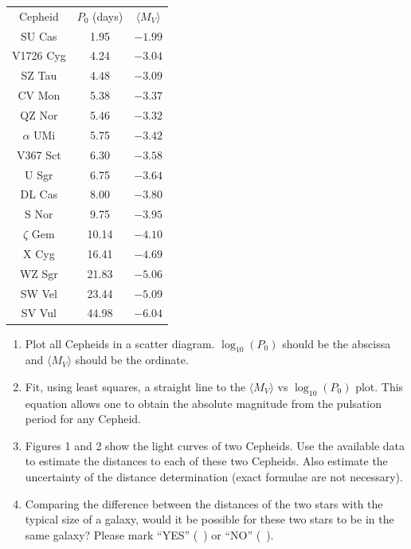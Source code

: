 \begin{center}
\begin{tabular}{ccc}
Cepheid & $P_0$ (days) & $\langle M_V\rangle$ \\
SU Cas & 1.95 & $-1.99$ \\
V1726 Cyg & 4.24 & $-3.04$ \\
SZ Tau & 4.48 & $-3.09$ \\
CV Mon & 5.38 & $-3.37$ \\
QZ Nor & 5.46 & $-3.32$ \\
$\alpha$ UMi & 5.75 & $-3.42$ \\
V367 Sct & 6.30 & $-3.58$ \\
U Sgr & 6.75 & $-3.64$ \\
DL Cas & 8.00 & $-3.80$ \\
S Nor & 9.75 & $-3.95$ \\
$\zeta$ Gem & 10.14 & $-4.10$ \\
X Cyg & 16.41 & $-4.69$ \\
WZ Sgr & 21.83 & $-5.06$ \\
SW Vel & 23.44 & $-5.09$ \\
SV Vul & 44.98 & $-6.04$ \\
\end{tabular}
\end{center}

\begin{enumerate}
\item Plot all Cepheids in a scatter diagram. $\log_{10}(P_0)$ should be the
  abscissa and $\langle M_V\rangle$ should be the ordinate.
\item Fit, using least squares, a straight line to the $\langle M_V\rangle$
  vs $\log_{10}(P_0)$ plot. This equation allows one to obtain the absolute
  magnitude from the pulsation period for any Cepheid.
\item Figures 1 and 2 show the light curves of two Cepheids. Use the
  available data to estimate the distances to each of these two Cepheids.
  Also estimate the uncertainty of the distance determination (exact
  formulae are not necessary).
\item Comparing the difference between the distances of the two stars with
  the typical size of a galaxy, would it be possible for these two stars to
  be in the same galaxy? Please mark ``YES'' (~) or ``NO'' (~).
\end{enumerate}

